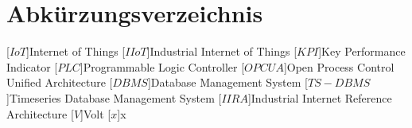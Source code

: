 \clearpage
\chapter*{Abkürzungsverzeichnis}\label{abkuerzungsverzeichnis}
\begin{acronym}[YTM]
\setlength{\itemsep}{-\parsep}

[$IoT$]{\hspace{1cm}Internet of Things}
[$IIoT$]{\hspace{1cm}Industrial Internet of Things}
[$KPI$]{\hspace{1cm}Key Performance Indicator}
[$PLC$]{\hspace{1cm}Programmable Logic Controller}
[$OPC UA$]{\hspace{1cm}Open Process Control Unified Architecture}
[$DBMS$]{\hspace{1cm}Database Management System}
[$TS-DBMS$]{\hspace{1cm}Timeseries Database Management System}
[$IIRA$]{\hspace{1cm}Industrial Internet Reference Architecture}
[$V$]{\hspace{1cm}Volt}
\acro{}[$x$]{\hspace{1cm}x}

\end{acronym}

